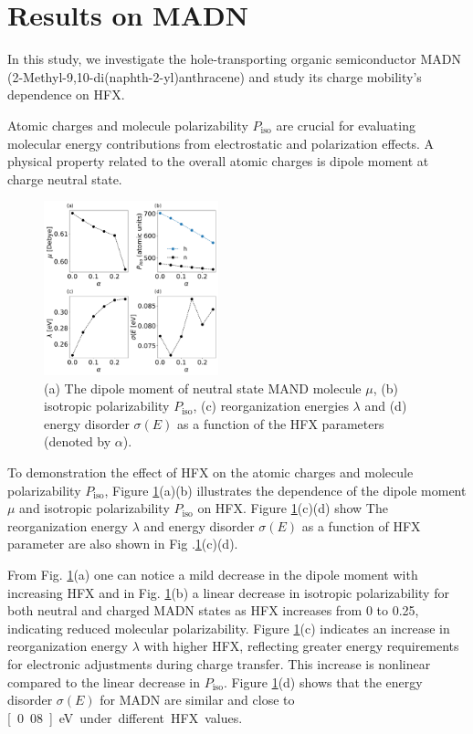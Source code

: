 \documentclass[%
 reprint,
 amsmath,amssymb,
 aps,
]{revtex4-2}
\begin{document}
\section{Results on MADN}

In this study, we investigate the hole-transporting organic semiconductor MADN (2-Methyl-9,10-di(naphth-2-yl)anthracene) and study its charge mobility's dependence on HFX. 

Atomic charges and molecule polarizability $P_\text{iso}$ are crucial for evaluating molecular energy contributions from electrostatic and polarization effects. A physical property related to the overall atomic charges is dipole moment at charge neutral state. 


%
\begin{figure}
    \centering
    \includegraphics[width=0.45\textwidth]{figs/fig_autogen.pdf}
    \caption{(a) The dipole moment of neutral state MAND molecule $\mu$, (b) isotropic polarizability $P_\text{iso}$, (c) reorganization energies $\lambda$ and (d) energy disorder $\sigma(E)$ as a function of the HFX parameters (denoted by $\alpha$).}
    \label{fig:autogen_MADN}
\end{figure}
% 

To demonstration the effect of HFX on the atomic charges and molecule polarizability $P_\text{iso}$,
Figure \ref{fig:autogen_MADN}(a)(b) illustrates the dependence of the dipole moment $\mu$ and isotropic polarizability $P_\text{iso}$ on HFX.
Figure \ref{fig:autogen_MADN}(c)(d) show 
The reorganization energy $\lambda$ and energy disorder $\sigma(E)$ as a function of HFX parameter are also shown in Fig .\ref{fig:autogen_MADN}(c)(d).

From Fig. \ref{fig:autogen_MADN}(a) one can notice a mild decrease in the dipole moment with increasing HFX and in Fig. \ref{fig:autogen_MADN}(b) a linear decrease in isotropic polarizability for both neutral and charged MADN states as HFX increases from 0 to 0.25, indicating reduced molecular polarizability.
Figure \ref{fig:autogen_MADN}(c) indicates an increase in reorganization energy $\lambda$ with higher HFX, reflecting greater energy requirements for electronic adjustments during charge transfer. This increase is nonlinear compared to the linear decrease in $P_\text{iso}$.
Figure \ref{fig:autogen_MADN}(d) shows that the energy disorder $\sigma(E)$ for MADN are similar and close to \unit[0.08]{eV} under different HFX values.
\end{document}
